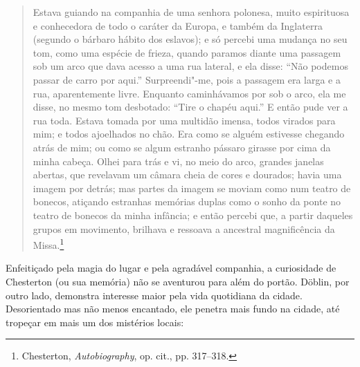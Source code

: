 \begin{quote}
Estava guiando na companhia de uma senhora polonesa, muito espirituosa e
conhecedora de todo o caráter da Europa, e também da Inglaterra (segundo
o bárbaro hábito dos eslavos); e só percebi uma mudança no seu tom, como
uma espécie de frieza, quando paramos diante uma passagem sob um arco
que dava acesso a uma rua lateral, e ela disse: ``Não podemos passar de
carro por aqui.'' Surpreendi"-me, pois a passagem era larga e a rua,
aparentemente livre. Enquanto caminhávamos por sob o arco, ela me disse,
no mesmo tom desbotado: ``Tire o chapéu aqui.'' E então pude ver a rua
toda. Estava tomada por uma multidão imensa, todos virados para mim; e
todos ajoelhados no chão. Era como se alguém estivesse chegando atrás de
mim; ou como se algum estranho pássaro girasse por cima da minha cabeça.
Olhei para trás e vi, no meio do arco, grandes janelas abertas, que
revelavam um câmara cheia de cores e dourados; havia uma imagem por
detrás; mas partes da imagem se moviam como num teatro de bonecos,
atiçando estranhas memórias duplas como o sonho da ponte no teatro de
bonecos da minha infância; e então percebi que, a partir daqueles grupos
em movimento, brilhava e ressoava a ancestral magnificência da
Missa.\footnote{Chesterton, \textit{Autobiography}, op. cit., pp. 317--318.}
\end{quote}

Enfeitiçado pela magia do lugar e pela agradável companhia, a
curiosidade de Chesterton (ou sua memória) não se aventurou para além do
portão. Döblin, por outro lado, demonstra interesse maior pela vida
quotidiana da cidade. Desorientado mas não menos encantado, ele penetra
mais fundo na cidade, até tropeçar em mais um dos mistérios locais:

